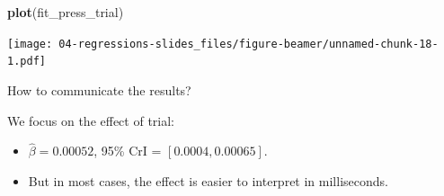 \documentclass[12pt,ignorenonframetext,aspectratio=169]{beamer}
\newenvironment{Shaded}{\begin{snugshade}}{\end{snugshade}}
\newcommand{\KeywordTok}[1]{\textcolor[rgb]{0.13,0.29,0.53}{\textbf{#1}}}
\newcommand{\NormalTok}[1]{#1}
\begin{document}
\begin{frame}[fragile]

\small

\begin{Shaded}
\begin{Highlighting}[]
\KeywordTok{plot}\NormalTok{(fit_press_trial)}
\end{Highlighting}
\end{Shaded}

\texttt{[image: 04-regressions-slides\_files/figure-beamer/unnamed-chunk-18-1.pdf]}

\normalsize

\end{frame}

\begin{frame}{How to communicate the results?}
\protect\hypertarget{how-to-communicate-the-results-2}{}

\small

\normalsize

\begin{block}{We focus on the effect of trial:}

\begin{itemize}
\item
  \(\hat\beta = 0.00052\), 95\% CrI = \([ 0.0004 , 0.00065 ]\).
\item
  But in most cases, the effect is easier to interpret in milliseconds.
\end{itemize}

\end{block}

\end{frame}
\end{document}
